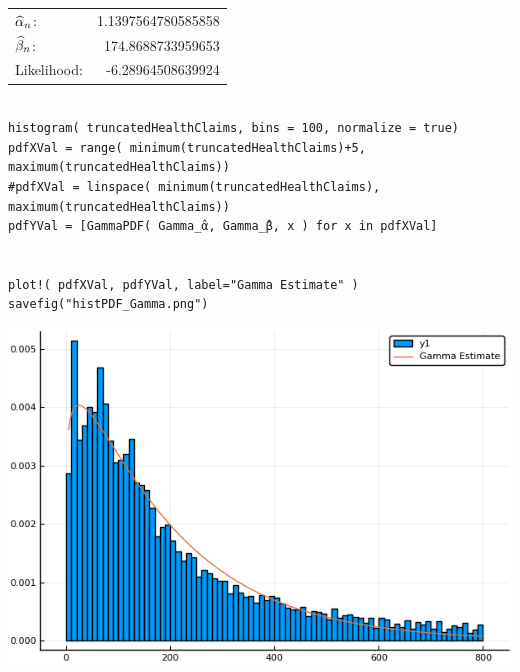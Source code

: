 \documentclass[12pt, letterpaper]{paper}
\begin{document}
\begin{center}
\begin{tabular}{lr}
\(\widehat{ \alpha }_{n}\): & 1.1397564780585858\\
\(\widehat{ \beta }_{n}\): & 174.8688733959653\\
Likelihood: & -6.28964508639924\\
\end{tabular}
\end{center}

\begin{verbatim}

histogram( truncatedHealthClaims, bins = 100, normalize = true)
pdfXVal = range( minimum(truncatedHealthClaims)+5, maximum(truncatedHealthClaims))
#pdfXVal = linspace( minimum(truncatedHealthClaims), maximum(truncatedHealthClaims))
pdfYVal = [GammaPDF( Gamma_̂α, Gamma_̂β, x ) for x in pdfXVal]


plot!( pdfXVal, pdfYVal, label="Gamma Estimate" )
savefig("histPDF_Gamma.png")
\end{verbatim}

\begin{center}
\includegraphics[width=.9\linewidth]{histPDF_Gamma.png}
\end{center}
\end{document}
